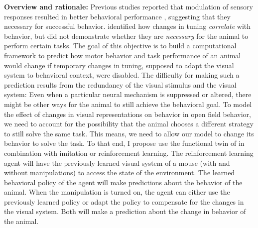 \documentclass[B2,COG]{ercgrant}
\begin{document}
\textbf{Overview and rationale:} 
Previous studies reported that modulation of sensory responses resulted in better behavioral performance \parencite{Spitzer1988-kq, Bennett2013-rk, Dadarlat2017-jw, De_Gee2022-ir}, suggesting that they necessary for successful behavior. 
 identified how changes in tuning \textit{correlate} with behavior, but did not demonstrate whether they are \textit{necessary} for the animal to perform certain tasks.
The goal of this objective is to build a computational framework to predict how motor behavior and task performance of an animal would change if temporary changes in tuning, supposed to adapt the visual system to behavioral context, were disabled.  
The difficulty for making such a prediction results from the redundancy of the visual stimulus and the visual system: 
Even when a particular neural mechanism is suppressed or altered, there might be other ways for the animal to still achieve the behavioral goal. 
To model the effect of changes in visual representations on behavior in open field behavior, we need to account for the possibility that the animal chooses a different strategy to still solve the same task. 
This means, we need to allow our model to change its behavior to solve the task. 
To that end, I propose use the functional twin of in combination with imitation or reinforcement learning.
The reinforcement learning agent will have the previously learned visual system of a mouse (with and without manipulations) to access the state of the environment.
The learned behavioral policy of the agent will make predictions about the behavior of the animal. 
When the manipulation is turned on, the agent can either use the previously learned policy or adapt the policy to compensate for the changes in the visual system.
Both will make a prediction about the change in behavior of the animal. 
\end{document}
